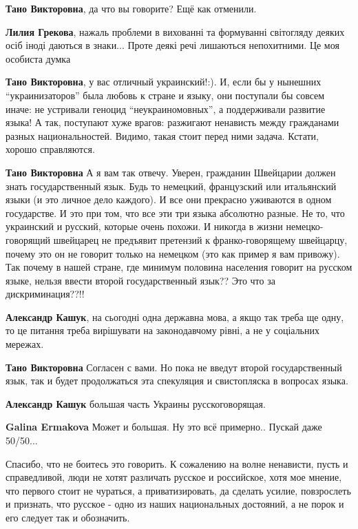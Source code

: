 \begin{itemize}
{\begin{itemize}

\textbf{Тано Викторовна}, да что вы говорите? Ещё как отменили.

\textbf{Лилия Грекова}, нажаль проблеми в вихованні та формуванні світогляду деяких осіб іноді даються в знаки... Проте деякі речі лишаються непохитними. Це моя особиста думка

\textbf{Тано Викторовна}, у вас отличный украинский!:). И, если бы у нынешних
\enquote{украинизаторов} была любовь к стране и языку, они поступали бы совсем иначе:
не устривали геноцид \enquote{неукраиномовных}, а поддерживали развитие языка! А так,
поступают хуже врагов: разжигают ненависть между гражданами разных
национальностей. Видимо, такая стоит перед ними задача. Кстати, хорошо
справляются.

\textbf{Тано Викторовна} А я вам так отвечу. Уверен, гражданин Швейцарии должен
знать государственный язык. Будь то немецкий, французский или итальянский языки
(и это личное дело каждого). И все они прекрасно уживаются в одном государстве.
И это при том, что все эти три языка абсолютно разные. Не то, что украинский и
русский, которые очень похожи. И никогда в жизни немецко-говорящий швейцарец не
предъявит претензий к франко-говорящему швейцарцу, почему это он не говорит
только на немецком (это как пример я вам привожу). Так почему в нашей стране,
где минимум половина населения говорит на русском языке, нельзя ввести второй
государственный язык?? Это что за дискриминация??!!

\textbf{Александр Кашук}, на сьогодні одна державна мова, а якщо так треба ще
одну, то це питання треба вирішувати на законодавчому рівні, а не у соціальних
мережах.

\textbf{Тано Викторовна} Согласен с вами. Но пока не введут второй
государственный язык, так и будет продолжаться эта спекуляция и свистопляска в
вопросах языка.

\textbf{Александр Кашук} большая часть Украины русскоговорящая.

\textbf{Galina Ermakova} Может и большая. Ну это всё примерно.. Пускай даже 50/50...

\end{itemize}



Спасибо, что не боитесь это говорить. К сожалению на волне ненависти, пусть и
справедливой, люди не хотят различать русское и российское, хотя мое мнение,
что первого стоит не чураться, а приватизировать, да сделать усилие,
повзрослеть и признать, что русское - одно из наших национальных достояний, а
не порок и его следует так и обозначить.

}
\end{itemize}
